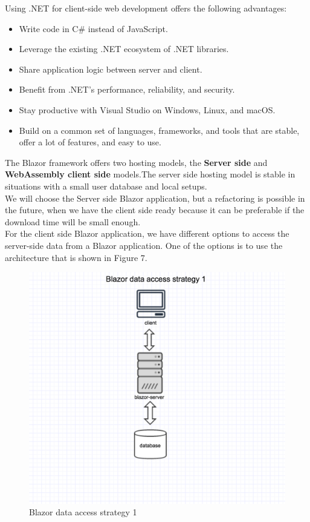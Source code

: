 \documentclass{scrartcl}
\begin{document}
Using .NET for client-side web development offers the following advantages:
\begin{itemize}
\item Write code in C\# instead of JavaScript.
\item Leverage the existing .NET ecosystem of .NET libraries.

\item Share application logic between server and client.

\item Benefit from .NET's performance, reliability, and security.

\item Stay productive with Visual Studio on Windows, Linux, and macOS.

\item Build on a common set of languages, frameworks, and tools that are stable, offer a lot of features, and easy to use. \cite{blazor}

\end{itemize} 


The Blazor framework offers two hosting models, the \textbf{Server side} and \textbf{WebAssembly client side} models.The server side hosting model is stable in situations with a small user database and local setups.\\
We will choose the Server side Blazor application, but a refactoring is possible in the future, when we have the client side ready because it can be preferable if the download time will be small enough. \\

For the client side Blazor application, we have different options to access the server-side data from a Blazor application.
One of the options is to use the architecture that is shown in Figure 7.\\
\begin{figure}[H]
\centering
\includegraphics[width=150mm]{data/ds1.JPG}
\caption{Blazor data access strategy 1 }
\label{blabla}
\end{figure}
\end{document}
